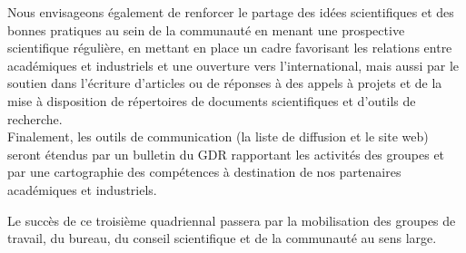 \documentclass[11pt]{article}
\begin{document}
Nous envisageons également de renforcer le partage des idées scientifiques et
des bonnes pratiques au sein de la communauté en menant une prospective
scientifique régulière, en mettant en place un cadre favorisant les relations
entre académiques et industriels et une ouverture vers l'international, mais
aussi par le soutien dans l'écriture d'articles ou de réponses à des appels à
projets et de la mise à disposition de répertoires de documents scientifiques
et d'outils de recherche. 
\\

Finalement, les outils de communication (la liste de diffusion et le site web) seront étendus par un bulletin du GDR rapportant les activités des groupes et par une cartographie des compétences à destination de nos partenaires académiques et industriels.

Le succès de ce troisième quadriennal passera par la mobilisation des groupes
de travail, du bureau, du conseil scientifique et de la communauté au sens
large.
\end{document}
